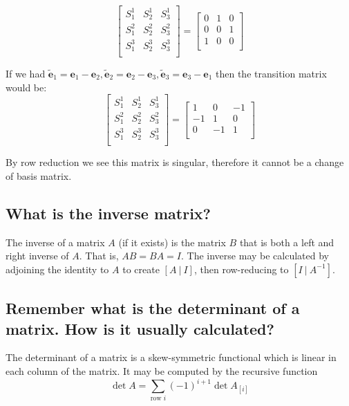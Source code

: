 \documentclass{article}
\newcommand{\basis}{\mathbf{e}_1}
\newcommand{\basiss}{\mathbf{e}_2}
\newcommand{\basisss}{\mathbf{e}_3}
\newcommand{\nbasis}{\widetilde{\mathbf{e}}_1}
\newcommand{\nbasiss}{\widetilde{\mathbf{e}}_2}
\newcommand{\nbasisss}{\widetilde{\mathbf{e}}_3}
\begin{document}
$$
\begin{bmatrix}
	S_1^1 & S_2^1 & S_3^1 \\
	S_1^2 & S_2^2 & S_3^2 \\
	S_1^3 & S_2^3 & S_3^3 \\
\end{bmatrix}
=
\begin{bmatrix}
	0 & 1 & 0 \\
	0 & 0 & 1 \\
	1 & 0 & 0 \\
\end{bmatrix}$$

If we had $\nbasis = \basis - \basiss, \nbasiss = \basiss - \basisss, \nbasisss = \basisss - \basis$ then the transition matrix would be:
$$
\begin{bmatrix}
	S_1^1 & S_2^1 & S_3^1 \\
	S_1^2 & S_2^2 & S_3^2 \\
	S_1^3 & S_2^3 & S_3^3 \\
\end{bmatrix}
=
\begin{bmatrix}
	1  & 0  & -1 \\
	-1 & 1  & 0 \\
	0  & -1 & 1 \\
\end{bmatrix}$$

By row reduction we see this matrix is singular, therefore it cannot be a change of basis matrix.

\subsection{What is the inverse matrix?}

The inverse of a matrix $A$ (if it exists) is the matrix $B$ that is both a left and right inverse of $A$. That is, $AB = BA = I$. The inverse may be calculated by adjoining the identity to $A$ to create $[ A \ | \ I ]$, then row-reducing to $[ I \ | \ A^{-1} ]$.

\subsection{Remember what is the determinant of a matrix. How is it usually calculated?}

The determinant of a matrix is a skew-symmetric functional which is linear in each column of the matrix. It may be computed by the recursive function 
$$\det A = \sum_{\text{row } i} (-1)^{i+1} \det A_{[i]}$$
\end{document}
